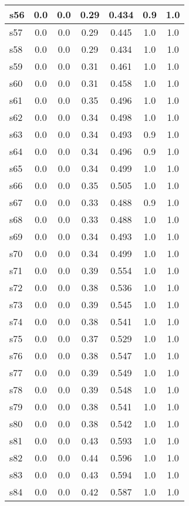 \documentclass{article}
\begin{document}
\begin{tabular}{|l|c|c|c|c|c|c|}
\hline
s56 &0.0 & 0.0 & 0.29 & 0.434 & 0.9 & 1.0\\
\hline
s57 &0.0 & 0.0 & 0.29 & 0.445 & 1.0 & 1.0\\
\hline
s58 &0.0 & 0.0 & 0.29 & 0.434 & 1.0 & 1.0\\
\hline
s59 &0.0 & 0.0 & 0.31 & 0.461 & 1.0 & 1.0\\
\hline
s60 &0.0 & 0.0 & 0.31 & 0.458 & 1.0 & 1.0\\
\hline
s61 &0.0 & 0.0 & 0.35 & 0.496 & 1.0 & 1.0\\
\hline
s62 &0.0 & 0.0 & 0.34 & 0.498 & 1.0 & 1.0\\
\hline
s63 &0.0 & 0.0 & 0.34 & 0.493 & 0.9 & 1.0\\
\hline
s64 &0.0 & 0.0 & 0.34 & 0.496 & 0.9 & 1.0\\
\hline
s65 &0.0 & 0.0 & 0.34 & 0.499 & 1.0 & 1.0\\
\hline
s66 &0.0 & 0.0 & 0.35 & 0.505 & 1.0 & 1.0\\
\hline
s67 &0.0 & 0.0 & 0.33 & 0.488 & 0.9 & 1.0\\
\hline
s68 &0.0 & 0.0 & 0.33 & 0.488 & 1.0 & 1.0\\
\hline
s69 &0.0 & 0.0 & 0.34 & 0.493 & 1.0 & 1.0\\
\hline
s70 &0.0 & 0.0 & 0.34 & 0.499 & 1.0 & 1.0\\
\hline
s71 &0.0 & 0.0 & 0.39 & 0.554 & 1.0 & 1.0\\
\hline
s72 &0.0 & 0.0 & 0.38 & 0.536 & 1.0 & 1.0\\
\hline
s73 &0.0 & 0.0 & 0.39 & 0.545 & 1.0 & 1.0\\
\hline
s74 &0.0 & 0.0 & 0.38 & 0.541 & 1.0 & 1.0\\
\hline
s75 &0.0 & 0.0 & 0.37 & 0.529 & 1.0 & 1.0\\
\hline
s76 &0.0 & 0.0 & 0.38 & 0.547 & 1.0 & 1.0\\
\hline
s77 &0.0 & 0.0 & 0.39 & 0.549 & 1.0 & 1.0\\
\hline
s78 &0.0 & 0.0 & 0.39 & 0.548 & 1.0 & 1.0\\
\hline
s79 &0.0 & 0.0 & 0.38 & 0.541 & 1.0 & 1.0\\
\hline
s80 &0.0 & 0.0 & 0.38 & 0.542 & 1.0 & 1.0\\
\hline
s81 &0.0 & 0.0 & 0.43 & 0.593 & 1.0 & 1.0\\
\hline
s82 &0.0 & 0.0 & 0.44 & 0.596 & 1.0 & 1.0\\
\hline
s83 &0.0 & 0.0 & 0.43 & 0.594 & 1.0 & 1.0\\
\hline
s84 &0.0 & 0.0 & 0.42 & 0.587 & 1.0 & 1.0\\

\end{tabular}
\end{document}
